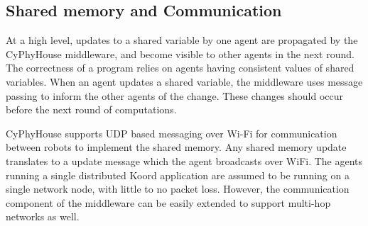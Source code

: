 \subsection{Shared memory and Communication}

At a high level, updates to a shared variable by one agent are propagated by the CyPhyHouse middleware, and become visible to other agents in the next round. The correctness of a program relies on agents having consistent values of shared variables. When an agent updates a shared variable, the middleware uses message passing to inform the other agents of the change. These changes should occur before the next round of computations.

CyPhyHouse supports UDP based messaging over Wi-Fi for communication between robots to implement the shared memory. Any shared memory update translates to a update message which the agent broadcasts over WiFi. The agents running a single distributed Koord application are assumed to be running on a single network node, with little to no packet loss. However, the communication component of the middleware can be easily extended to support multi-hop networks as well.
